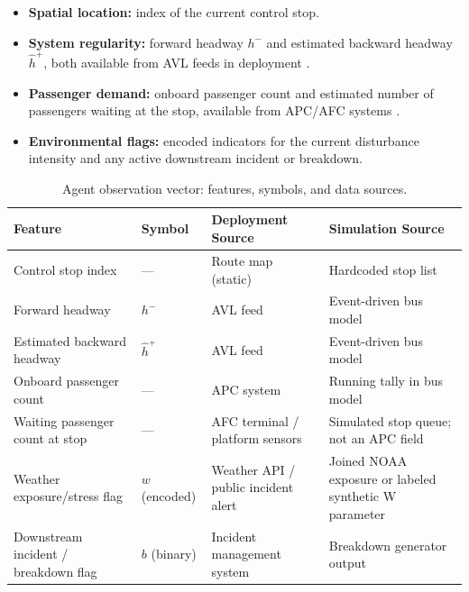 \begin{itemize}
\item \textbf{Spatial location:} index of the current control stop.
\item \textbf{System regularity:} forward headway $h^-$ and estimated backward headway $\hat{h}^+$, both available from AVL feeds in deployment \cite{Wangsun}.
\item \textbf{Passenger demand:} onboard passenger count and estimated number of passengers waiting at the stop, available from APC/AFC systems \cite{Wangsun}.
\item \textbf{Environmental flags:} encoded indicators for the current disturbance intensity and any active downstream incident or breakdown.
\end{itemize}

\begin{table}[htbp]
\centering
\caption{Agent observation vector: features, symbols, and data sources.}
\label{tab:observation-features}
\small
\renewcommand{\arraystretch}{1.25}

\begin{tabularx}{\textwidth}{
>{\RaggedRight\arraybackslash}p{}
>{\RaggedRight\arraybackslash}p{}
>{\RaggedRight\arraybackslash}X
>{\RaggedRight\arraybackslash}X
}

\toprule
\textbf{Feature} & \textbf{Symbol} & \textbf{Deployment Source} & \textbf{Simulation Source} \\
\midrule

Control stop index & --- & Route map (static) & Hardcoded stop list \\
Forward headway & $h^-$ & AVL feed & Event-driven bus model \\
Estimated backward headway & $\hat{h}^+$ & AVL feed & Event-driven bus model \\
Onboard passenger count & --- & APC system & Running tally in bus model \\
Waiting passenger count at stop & --- & AFC terminal / platform sensors & Simulated stop queue; not an APC field \\
Weather exposure/stress flag & $w$ (encoded) & Weather API / public incident alert & Joined NOAA exposure or labeled synthetic W parameter \\
Downstream incident / breakdown flag & $b$ (binary) & Incident management system & Breakdown generator output \\

\bottomrule
\end{tabularx}
\end{table}

